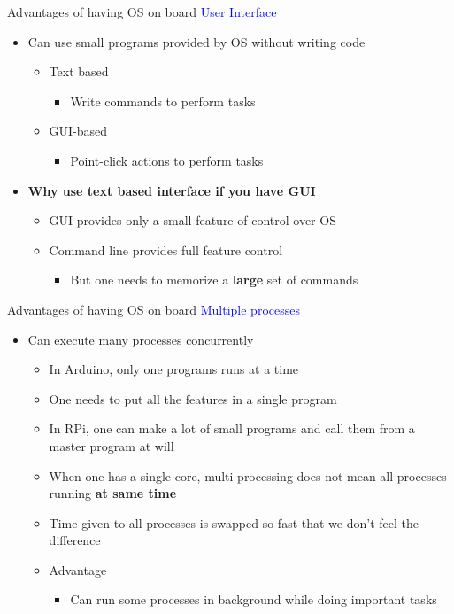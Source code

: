 \begin{frame}{Advantages of having OS on board}
	\textcolor{blue}{User Interface}
	\begin{itemize}
		\item Can use small programs provided by OS without writing code
		\begin{itemize}
			\item Text based
			\begin{itemize}
				\item Write commands to perform tasks
			\end{itemize}
			\item GUI-based
			\begin{itemize}
				\item Point-click actions to perform tasks
			\end{itemize}
		\end{itemize}
		\item \textbf{Why use text based interface if you have GUI}
		\begin{itemize}
			\item GUI provides only a small feature of control over OS
			\item Command line provides full feature control
			\begin{itemize}
				\item But one needs to memorize a \textbf{large} set of commands
			\end{itemize}
		\end{itemize}
	\end{itemize}
\end{frame}

\begin{frame}{Advantages of having OS on board}
	\textcolor{blue}{Multiple processes}
	\begin{itemize}
		\item Can execute many processes concurrently
		\begin{itemize}
			\item In Arduino, only one programs runs at a time
			\item One needs to put all the features in a single program
			\item In RPi, one can make a lot of small programs and call them from a master program at will
			\item When one has a single core, multi-processing does not mean all processes running \textbf{at same time}
			\item Time given to all processes is swapped so fast that we don't feel the difference
			\item Advantage
			\begin{itemize}
				\item Can run some processes in background while doing important tasks
			\end{itemize}
		\end{itemize}
	\end{itemize}
\end{frame}

